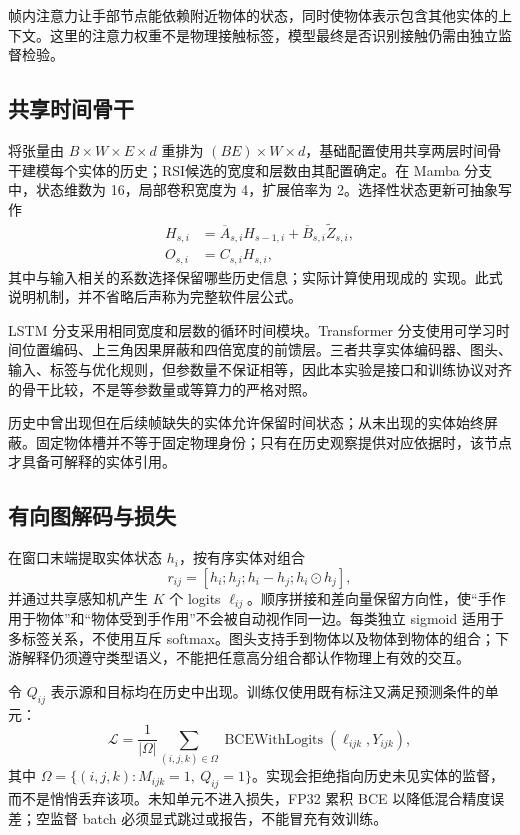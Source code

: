 帧内注意力让手部节点能依赖附近物体的状态，同时使物体表示包含其他实体的上下文。这里的注意力权重不是物理接触标签，模型最终是否识别接触仍需由独立监督检验。

\subsection{共享时间骨干}
将张量由 $B\times W\times E\times d$ 重排为 $(BE)\times W\times d$，基础配置使用共享两层时间骨干建模每个实体的历史；RSI候选的宽度和层数由其配置确定。在 Mamba 分支中，状态维数为 16，局部卷积宽度为 4，扩展倍率为 2。选择性状态更新可抽象写作
\begin{align}
 H_{s,i}&=\overline A_{s,i}H_{s-1,i}
             +\overline B_{s,i}\widetilde Z_{s,i},\\
 O_{s,i}&=C_{s,i}H_{s,i},
\end{align}
其中与输入相关的系数选择保留哪些历史信息；实际计算使用现成的  实现。此式说明机制，并不省略后声称为完整软件层公式。

LSTM 分支采用相同宽度和层数的循环时间模块。Transformer 分支使用可学习时间位置编码、上三角因果屏蔽和四倍宽度的前馈层。三者共享实体编码器、图头、输入、标签与优化规则，但参数量不保证相等，因此本实验是接口和训练协议对齐的骨干比较，不是等参数量或等算力的严格对照。

历史中曾出现但在后续帧缺失的实体允许保留时间状态；从未出现的实体始终屏蔽。固定物体槽并不等于固定物理身份；只有在历史观察提供对应依据时，该节点才具备可解释的实体引用。

\subsection{有向图解码与损失}
在窗口末端提取实体状态 $h_i$，按有序实体对组合
\begin{equation}
 r_{ij}=[h_i;h_j;h_i-h_j;h_i\odot h_j],
\end{equation}
并通过共享感知机产生 $K$ 个 logits $\ell_{ij}$。顺序拼接和差向量保留方向性，使“手作用于物体”和“物体受到手作用”不会被自动视作同一边。每类独立 sigmoid 适用于多标签关系，不使用互斥 softmax。图头支持手到物体以及物体到物体的组合；下游解释仍须遵守类型语义，不能把任意高分组合都认作物理上有效的交互。

令 $Q_{ij}$ 表示源和目标均在历史中出现。训练仅使用既有标注又满足预测条件的单元：
\begin{equation}
 \mathcal L=\frac{1}{|\Omega|}
 \sum_{(i,j,k)\in\Omega}
 \operatorname{BCEWithLogits}(\ell_{ijk},Y_{ijk}),
\end{equation}
其中 $\Omega=\{(i,j,k):M_{ijk}=1,\ Q_{ij}=1\}$。实现会拒绝指向历史未见实体的监督，而不是悄悄丢弃该项。未知单元不进入损失，FP32 累积 BCE 以降低混合精度误差；空监督 batch 必须显式跳过或报告，不能冒充有效训练。

